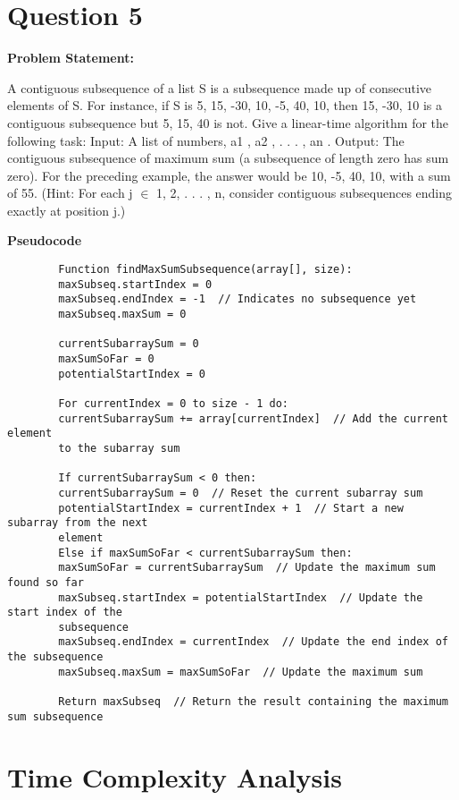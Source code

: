 \documentclass[a4paper,12pt]{report}
\begin{document}
\newpage
\section*{Question 5}

\textbf{Problem Statement:}  

A contiguous subsequence of a list S is a subsequence made up of consecutive elements of S. For instance, if S is 5, 15, -30, 10, -5, 40, 10, then 15, -30, 10 is a contiguous subsequence but 5, 15, 40 is not. Give a linear-time algorithm for the following task: Input: A list of numbers, a1 , a2 , . . . , an . Output: The contiguous subsequence of maximum sum (a subsequence of length zero has sum
zero). For the preceding example, the answer would be 10, -5, 40, 10, with a sum of 55.
(Hint: For each j $\in$ {1, 2, . . . , n}, consider contiguous subsequences 
ending exactly at position j.)

\textbf{Pseudocode}

\begin{tcolorbox}[colback=white, colframe=black, boxrule=0.5pt]
	\ttfamily\small
	\begin{verbatim}
		Function findMaxSumSubsequence(array[], size):
		maxSubseq.startIndex = 0
		maxSubseq.endIndex = -1  // Indicates no subsequence yet
		maxSubseq.maxSum = 0
		
		currentSubarraySum = 0
		maxSumSoFar = 0
		potentialStartIndex = 0
		
		For currentIndex = 0 to size - 1 do:
		currentSubarraySum += array[currentIndex]  // Add the current element 
		to the subarray sum
		
		If currentSubarraySum < 0 then:
		currentSubarraySum = 0  // Reset the current subarray sum
		potentialStartIndex = currentIndex + 1  // Start a new subarray from the next 
		element
		Else if maxSumSoFar < currentSubarraySum then:
		maxSumSoFar = currentSubarraySum  // Update the maximum sum found so far
		maxSubseq.startIndex = potentialStartIndex  // Update the start index of the 
		subsequence
		maxSubseq.endIndex = currentIndex  // Update the end index of the subsequence
		maxSubseq.maxSum = maxSumSoFar  // Update the maximum sum
		
		Return maxSubseq  // Return the result containing the maximum sum subsequence
	\end{verbatim}
\end{tcolorbox}

\section*{Time Complexity Analysis}
\end{document}
